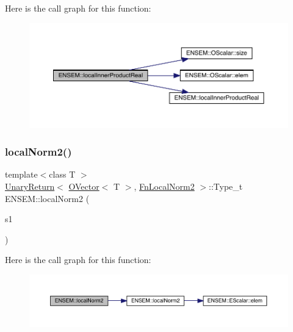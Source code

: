 Here is the call graph for this function\+:\nopagebreak
\begin{figure}[H]
\begin{center}
\leavevmode
\includegraphics[width=350pt]{da/d59/group__obsvector_ga1a740c7927429957c8bc0b75d070bb71_cgraph}
\end{center}
\end{figure}
\mbox{\label{group__obsvector_ga84dbc523abff754a5ecdd0658eb687e1}} 
\subsubsection{\texorpdfstring{localNorm2()}{localNorm2()}}
{\footnotesize\ttfamily template$<$class T $>$ \\
\mbox{\hyperlink{structENSEM_1_1UnaryReturn}{Unary\+Return}}$<$ \mbox{\hyperlink{classENSEM_1_1OVector}{O\+Vector}}$<$ T $>$, \mbox{\hyperlink{structENSEM_1_1FnLocalNorm2}{Fn\+Local\+Norm2}} $>$\+::Type\+\_\+t E\+N\+S\+E\+M\+::local\+Norm2 (\begin{DoxyParamCaption}\item[{const \mbox{\hyperlink{classENSEM_1_1OVector}{O\+Vector}}$<$ T $>$ \&}]{s1 }\end{DoxyParamCaption})\hspace{0.3cm}{\ttfamily [inline]}}

Here is the call graph for this function\+:\nopagebreak
\begin{figure}[H]
\begin{center}
\leavevmode
\includegraphics[width=350pt]{da/d59/group__obsvector_ga84dbc523abff754a5ecdd0658eb687e1_cgraph}
\end{center}
\end{figure}
\mbox{\label{group__obsvector_gaed658cf17815056e3f361233ba070ae0}} 
